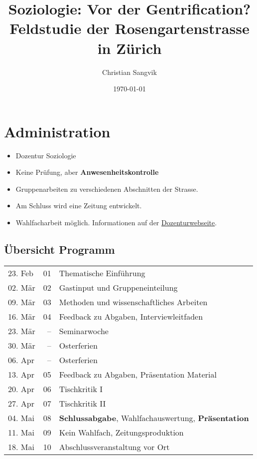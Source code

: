 \documentclass[a4paper,11pt,ngerman]{scrartcl}
\author{Christian Sangvik}
\date{\today}
\title{Soziologie: Vor der Gentrification? Feldstudie der Rosengartenstrasse in Zürich}
\begin{document}
\maketitle
\tableofcontents


\section{Administration}
\label{sec-1}

\begin{itemize}
\item Dozentur Soziologie
\item Keine Prüfung, aber \textbf{Anwesenheitskontrolle}
\item Gruppenarbeiten zu verschiedenen Abschnitten der Strasse.
\item Am Schluss wird eine Zeitung entwickelt.
\item Wahlfacharbeit möglich. Informationen auf der \href{http://www.soziologie.arch.ethz.ch/de/}{Dozenturwebseite}.
\end{itemize}

\subsection{Übersicht Programm}
\label{sec-1-1}

\begin{center}
\begin{tabular}{lrl}
23. Feb & 01 & Thematische Einführung\\
02. Mär & 02 & Gastinput und Gruppeneinteilung\\
09. Mär & 03 & Methoden und wissenschaftliches Arbeiten\\
16. Mär & 04 & Feedback zu Abgaben, Interviewleitfaden\\
23. Mär & -- & Seminarwoche\\
30. Mär & -- & Osterferien\\
06. Apr & -- & Osterferien\\
13. Apr & 05 & Feedback zu Abgaben, Präsentation Material\\
20. Apr & 06 & Tischkritik I\\
27. Apr & 07 & Tischkritik II\\
04. Mai & 08 & \textbf{Schlussabgabe}, Wahlfachauswertung, \textbf{Präsentation}\\
11. Mai & 09 & Kein Wahlfach, Zeitungsproduktion\\
18. Mai & 10 & Abschlussveranstaltung vor Ort\\
\end{tabular}
\end{center}
\end{document}
